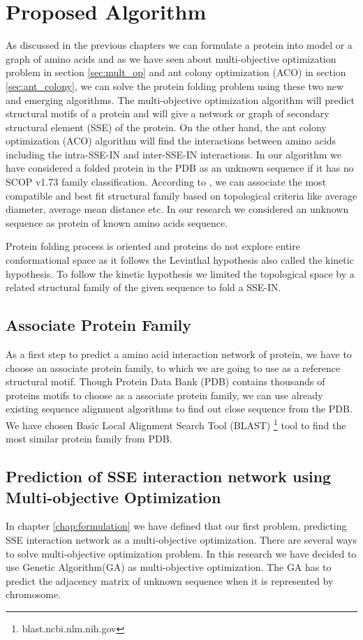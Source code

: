\chapter {Proposed Algorithm}
\label {chap:algorithm}

As discussed in the previous chapters we can formulate a protein into model or a graph of amino acids and as we have seen about multi-objective optimization problem in section \ref{sec:mult_op} and ant colony optimization (ACO) in section \ref{sec:ant_colony}, we can solve the protein folding problem using these two new and emerging algorithms. The multi-objective optimization algorithm will predict structural motifs of a protein and will give a network or graph of secondary structural element (SSE) of the protein. On the other hand, the ant colony optimization (ACO) algorithm will find the interactions between amino acids including the intra-SSE-IN and inter-SSE-IN interactions. In our algorithm we have considered a folded protein in the PDB as an unknown sequence if it has no SCOP v1.73 family classification. According to \cite{gaci2010build}, we can associate the most compatible and best fit structural family based on topological criteria like average diameter, average mean distance etc. In our research we considered an unknown sequence as protein of known amino acids sequence.

Protein folding process is oriented and proteins do not explore entire conformational space as it follows the Levinthal hypothesis also called the kinetic hypothesis. To follow the kinetic hypothesis we limited the topological space by a related structural family of the given sequence \cite{gaci2010build} to fold a SSE-IN. 
\section {Associate Protein Family}
As a first step to predict a amino acid interaction network of protein, we have to choose an associate protein family, to which we are going to use as a reference structural motif. Though Protein Data Bank (PDB) contains thousands of proteins motifs to choose as a associate protein family, we can use already existing sequence alignment algorithms to find out close sequence from the PDB. We have chosen Basic Local Alignment Search Tool (BLAST) \footnote{blast.ncbi.nlm.nih.gov} tool to find the most similar protein family from PDB.

\section {Prediction of SSE interaction network using Multi-objective Optimization}
In chapter \ref{chap:formulation} we have defined that our first problem, predicting SSE interaction network as a multi-objective optimization. There are several ways to solve multi-objective optimization problem. In this research we have decided to use Genetic Algorithm(GA) as multi-objective optimization. The GA has to predict the adjacency matrix of unknown sequence when it is represented by chromosome.
